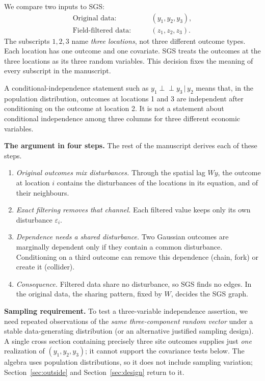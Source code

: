 \documentclass[11pt,a4paper]{article}
\newcommand{\indep}{\mathrel{\perp\!\!\!\perp}}
\newcommand{\given}{\,\vert\,}
\begin{document}
We compare two inputs to SGS:
\begin{align}
\text{Original data:}&\qquad (y_1,y_2,y_3),\label{eq:original}\\
\text{Field-filtered data:}&\qquad (z_1,z_2,z_3).\label{eq:filtered}
\end{align}
The subscripts $1,2,3$ name \emph{three locations}, not three different outcome types. Each location has one outcome and one covariate. SGS treats the outcomes at the three locations as its three random variables. This decision fixes the meaning of every subscript in the manuscript.

A conditional-independence statement such as $y_1\indep y_3\given y_2$ means that, in the population distribution, outcomes at locations 1 and 3 are independent after conditioning on the outcome at location 2. It is not a statement about conditional independence among three columns for three different economic variables.

\textbf{The argument in four steps.} The rest of the manuscript derives each of these steps.
\begin{enumerate}[leftmargin=*,label=\arabic*.]
\item \emph{Original outcomes mix disturbances.} Through the spatial lag $Wy$, the outcome at location $i$ contains the disturbances of the locations in its equation, and of their neighbours.
\item \emph{Exact filtering removes that channel.} Each filtered value keeps only its own disturbance $\varepsilon_i$.
\item \emph{Dependence needs a shared disturbance.} Two Gaussian outcomes are marginally dependent only if they contain a common disturbance. Conditioning on a third outcome can remove this dependence (chain, fork) or create it (collider).
\item \emph{Consequence.} Filtered data share no disturbance, so SGS finds no edges. In the original data, the sharing pattern, fixed by $W$, decides the SGS graph.
\end{enumerate}

\textbf{Sampling requirement.} To test a three-variable independence assertion, we need repeated observations of the \emph{same three-component random vector} under a stable data-generating distribution (or an alternative justified sampling design). A single cross section containing precisely three site outcomes supplies just \emph{one} realization of $(y_1,y_2,y_3)$; it cannot support the covariance tests below. The algebra uses population distributions, so it does not include sampling variation; Section~\ref{sec:outside} and Section~\ref{sec:design} return to it.
\end{document}
